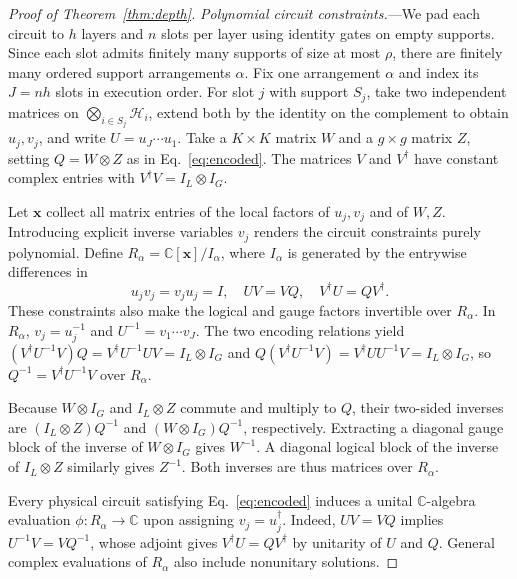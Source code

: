 \documentclass[aps,prl,reprint,notitlepage,nofootinbib,nobibnotes]{revtex4-2}
\newcommand{\HH}{\mathcal H}
\newcommand{\id}{I}
\begin{document}
\begin{proof}[Proof of Theorem~\ref{thm:depth}]
\emph{Polynomial circuit constraints.}---We pad each circuit to $h$ layers and $n$ slots per layer
using identity gates on empty supports. Since each slot admits finitely many supports of size at
most $\rho$, there are finitely many ordered support arrangements $\alpha$. Fix one arrangement
$\alpha$ and index its $J=nh$ slots in execution order. For slot $j$ with support $S_j$, take two
independent matrices on $\bigotimes_{i\in S_j}\HH_i$, extend both by the identity on the complement
to obtain $u_j,v_j$, and write $U=u_J\cdots u_1$. Take a $K\times K$ matrix $W$ and a $g\times g$
matrix $Z$, setting $Q=W\otimes Z$ as in Eq.~\eqref{eq:encoded}. The matrices $V$ and $V^\dagger$
have constant complex entries with $V^\dagger V=\id_L\otimes\id_G$.

Let $\mathbf x$ collect all matrix entries of the local factors of $u_j,v_j$ and of $W,Z$.
Introducing explicit inverse variables $v_j$ renders the circuit constraints purely polynomial.
Define $R_\alpha=\mathbb C[\mathbf x]/I_\alpha$, where $I_\alpha$ is generated by the entrywise
differences in
\begin{equation}
 u_jv_j=v_ju_j=\id,\quad UV=VQ,\quad V^\dagger U=QV^\dagger.\label{eq:algebraic-encoding}
\end{equation}
These constraints also make the logical and gauge factors invertible over $R_\alpha$. In
$R_\alpha$, $v_j=u_j^{-1}$ and $U^{-1}=v_1\cdots v_J$. The two encoding relations yield $(V^\dagger
U^{-1}V)Q=V^\dagger U^{-1}UV=\id_L\otimes\id_G$ and $Q(V^\dagger U^{-1}V)=V^\dagger
UU^{-1}V=\id_L\otimes\id_G$, so $Q^{-1}=V^\dagger U^{-1}V$ over $R_\alpha$.

Because $W\otimes\id_G$ and $\id_L\otimes Z$ commute and multiply to $Q$, their two-sided inverses
are $(\id_L\otimes Z)Q^{-1}$ and $(W\otimes\id_G)Q^{-1}$, respectively. Extracting a diagonal gauge
block of the inverse of $W\otimes\id_G$ gives $W^{-1}$. A diagonal logical block of the inverse of
$\id_L\otimes Z$ similarly gives $Z^{-1}$. Both inverses are thus matrices over $R_\alpha$.

Every physical circuit satisfying Eq.~\eqref{eq:encoded} induces a unital $\mathbb C$-algebra
evaluation $\phi:R_\alpha\to\mathbb C$ upon assigning $v_j=u_j^\dagger$. Indeed, $UV=VQ$ implies
$U^{-1}V=VQ^{-1}$, whose adjoint gives $V^\dagger U=QV^\dagger$ by unitarity of $U$ and $Q$.
General complex evaluations of $R_\alpha$ also include nonunitary solutions.


\end{proof}
\end{document}
